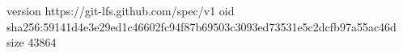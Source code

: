 version https://git-lfs.github.com/spec/v1
oid sha256:59141d4e3e29ed1c46602fc94f87b69503c3093ed73531e5c2dcfb97a55ac46d
size 43864
